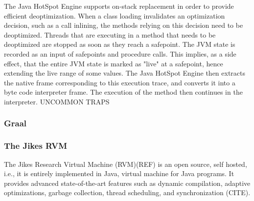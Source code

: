 The Java HotSpot Engine supports on-stack replacement in order to provide efficient deoptimization\cite{paleczny2001java}.
When a class loading invalidates an optimization decision, such as a call inlining, the methods relying on this decision need to be deoptimized.
Threads that are executing in a method that needs to be deoptimized are stopped as soon as they reach a safepoint.
The JVM state is recorded as an input of safepoints and procedure calls.
This implies, as a side effect, that the entire JVM state is marked as "live" at a safepoint, hence extending the live range of some values.
The Java HotSpot Engine then extracts the native frame corresponding to this execution trace, and converts it into a byte code interpreter frame.
The execution of the method then continues in the interpreter.
UNCOMMON TRAPS

\subsubsection{Graal}
\subsubsection{The Jikes RVM}
The Jikes Research Virtual Machine (RVM)(REF) is an open source, self hosted, i.e., it is entirely implemented in Java, virtual machine for Java programs.
It provides advanced state-of-the-art features such as dynamic compilation, adaptive optimizations, garbage collection, thread scheduling, and synchronization (CITE).\\


